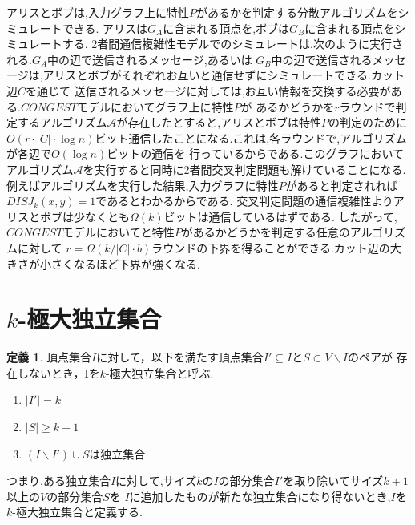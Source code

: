 \documentclass[12pt]{thesis}
\theoremstyle{definition}
\newtheorem{definition}{定義}[chapter]
\begin{document}
アリスとボブは,入力グラフ上に特性$P$があるかを判定する分散アルゴリズムをシミュレートできる.
アリスは$G_{A}$に含まれる頂点を,ボブは$G_{B}$に含まれる頂点をシミュレートする.
2者間通信複雑性モデルでのシミュレートは,次のように実行される.$G_{A}$中の辺で送信されるメッセージ,あるいは
$G_{B}$中の辺で送信されるメッセージは,アリスとボブがそれぞれお互いと通信せずにシミュレートできる.カット辺$C$を通じて
送信されるメッセージに対しては,お互い情報を交換する必要がある.$CONGEST$モデルにおいてグラフ上に特性$P$が
あるかどうかを$r$ラウンドで判定するアルゴリズム$\mathcal{A}$が存在したとすると,アリスとボブは特性$P$の判定のために
$O(r \cdot |C| \cdot \log n)$ビット通信したことになる.これは,各ラウンドで,アルゴリズムが各辺で$O(\log n)$ビットの通信を
行っているからである.このグラフにおいてアルゴリズム$\mathcal{A}$を実行すると同時に2者間交叉判定問題も解けていることになる.
例えばアルゴリズムを実行した結果,入力グラフに特性$P$があると判定されれば$DISJ_{k} (x, y)=1$であるとわかるからである.
交叉判定問題の通信複雑性よりアリスとボブは少なくとも$\Omega (k)$ビットは通信しているはずである.
したがって,$CONGEST$モデルにおいてと特性$P$があるかどうかを判定する任意のアルゴリズムに対して
$r = \Omega (k / |C| \cdot b)$ラウンドの下界を得ることができる.カット辺の大きさが小さくなるほど下界が強くなる.

\section{$k$-極大独立集合}

\begin{definition}
頂点集合$I$に対して，以下を満たす頂点集合$I' \subseteq I$と$S\subset V \backslash I$のペアが
存在しないとき，Iを$k$-極大独立集合と呼ぶ.
\begin{enumerate}
\item $|I'| = k$
\item $|S| \geq k + 1$
\item $(I \backslash I') \cup S$は独立集合
\end{enumerate}
\end{definition}
つまり,ある独立集合$I$に対して,サイズ$k$の$I$の部分集合$I'$を取り除いてサイズ$k + 1$以上の$V$の部分集合$S$を
$I$に追加したものが新たな独立集合になり得ないとき,$I$を$k$-極大独立集合と定義する.
\end{document}
